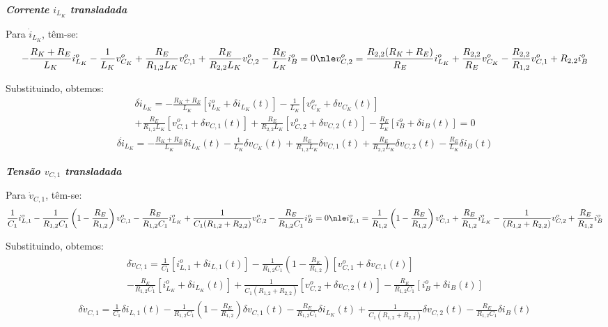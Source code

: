 \textbf{\textit{Corrente $i_{L_K}$ transladada}} \vspace*{12pt}

Para $\dot{i}_{L_K}$, têm-se:
\begin{gather}
  - \frac{R_K + R_E}{L_K} i_{L_K}^o - \frac{1}{L_K} v_{C_K}^o + \frac{R_E}{{R_{1,2}}L_K} v_{C,1}^o + \frac{R_E}{R_{2,2}L_K} v_{C,2}^o - \frac{R_E}{L_K} i_B^o= 0 \nle
  v_{C,2}^o = \frac{R_{2,2}(R_K + R_E)}{R_E} i_{L_K}^o + \frac{R_{2,2}}{R_E} v_{C_K}^o - \frac{R_{2,2}}{{R_{1,2}}} v_{C,1}^o + R_{2,2}i_B^o
\end{gather}

Substituindo, obtemos:
\begin{multline*}
  \delta \dot{i}_{L_K} = - \frac{R_K + R_E}{L_K} \left[i_{L_K}^o + \delta i_{L_K}(t)\right]
  - \frac{1}{L_K} \left[v_{C_K}^o + \delta v_{C_K}(t)\right] \\
  + \frac{R_E}{{R_{1,2}}L_K} \left[v_{C,1}^o + \delta v_{C,1}(t)\right]
  + \frac{R_E}{R_{2,2}L_K} \left[v_{C,2}^o + \delta v_{C,2}(t)\right] - \frac{R_E}{L_K} \left[i_B^o + \delta i_B(t)\right] = 0
\end{multline*}
\begin{gather}
  \delta \dot{i}_{L_K} = - \frac{R_K + R_E}{L_K} \delta i_{L_K}(t)
  - \frac{1}{L_K} \delta v_{C_K}(t)
  + \frac{R_E}{{R_{1,2}}L_K} \delta v_{C,1}(t)
  + \frac{R_E}{R_{2,2}L_K} \delta v_{C,2}(t)
  - \frac{R_E}{L_K} \delta i_B(t)
\end{gather}

\textbf{\textit{Tensão $v_{C,1}$ transladada}} \vspace*{12pt}

Para $\dot{v}_{C,1}$, têm-se:
\begin{gather}
  \frac{1}{C_1} i_{L,1}^o - \frac{1}{R_{1,2}C_1} \left(1 - \frac{R_E}{{R_{1,2}}}\right) v_{C,1}^o - \frac{R_E}{R_{1,2} C_1} i_{L_K}^o + \frac{1}{C_1 (R_{1,2} + R_{2,2})} v_{C,2}^o - \frac{R_E}{R_{1,2}C_1} i_B^o = 0 \nle
  i_{L,1}^o = \frac{1}{R_{1,2}} \left(1 - \frac{R_E}{{R_{1,2}}}\right) v_{C,1}^o + \frac{R_E}{R_{1,2} } i_{L_K}^o - \frac{1}{ (R_{1,2} + R_{2,2})} v_{C,2}^o + \frac{R_E}{R_{1,2}} i_B^o
\end{gather}

Substituindo, obtemos:
\begin{multline*}
  \delta \dot v_{C,1} = \frac{1}{C_1} \left[i_{L,1}^o + \delta i_{L,1}(t)\right]
  - \frac{1}{R_{1,2}C_1} \left(1 - \frac{R_E}{{R_{1,2}}}\right) \left[v_{C,1}^o + \delta v_{C,1}(t)\right] \\
  - \frac{R_E}{R_{1,2} C_1} \left[i_{L_K}^o + \delta i_{L_K}(t)\right]
  + \frac{1}{C_1 (R_{1,2} + R_{2,2})} \left[v_{C,2}^o + \delta v_{C,2}(t) \right]
  - \frac{R_E}{R_{1,2} C_1} \left[i_B^o + \delta i_B(t)\right]
\end{multline*}
\begin{gather}
  \delta \dot v_{C,1} = \frac{1}{C_1} \delta i_{L,1}(t)
  - \frac{1}{R_{1,2}C_1} \left(1 - \frac{R_E}{{R_{1,2}}}\right) \delta v_{C,1}(t)
  - \frac{R_E}{R_{1,2} C_1} \delta i_{L_K}(t)
  + \frac{1}{C_1 (R_{1,2} + R_{2,2})} \delta v_{C,2}(t)
  - \frac{R_E}{R_{1,2} C_1} \delta i_B(t)
\end{gather}

